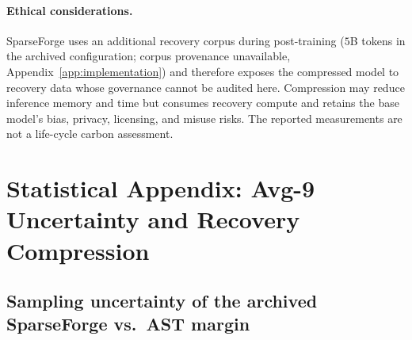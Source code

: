 \documentclass{article}
\begin{document}
\paragraph{Ethical considerations.}
SparseForge uses an additional recovery corpus during post-training ($5$B tokens in the archived
configuration; corpus provenance unavailable, Appendix~\ref{app:implementation}) and therefore
exposes the compressed model to recovery data whose governance cannot be audited here. Compression
may reduce inference memory and time but consumes recovery compute and retains the base model's bias,
privacy, licensing, and misuse risks. The reported measurements are not a life-cycle carbon
assessment.

\label{p5:main-text-end}



\appendix
\setlength{\intextsep}{6pt plus 2pt minus 2pt}
\setlength{\abovecaptionskip}{4pt}
\section{Statistical Appendix: Avg-9 Uncertainty and Recovery Compression}
\label{app:stats}

\subsection{Sampling uncertainty of the archived SparseForge vs.\ AST margin}
\label{app:sf-ast-stats}
\end{document}
